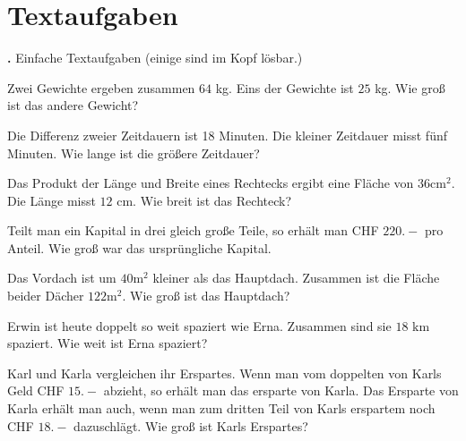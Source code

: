 \platzFuerBerechnungenBisEndeSeite{}
\newpage

\section{Textaufgaben}

\textbf{\bbwAufgabenNummer{}.}
Einfache Textaufgaben (einige sind im Kopf lösbar.)

\begin{bbwAufgabenBlock}
\item Zwei Gewichte ergeben zusammen $64$ kg. Eins der Gewichte ist
$25$ kg. Wie groß ist das andere Gewicht?


\item Die Differenz zweier Zeitdauern ist 18 Minuten. Die kleiner
Zeitdauer misst fünf Minuten. Wie lange ist die größere Zeitdauer?


\item Das Produkt der Länge und Breite eines Rechtecks ergibt eine
Fläche von $36 \text{cm}^2$. Die Länge misst $12$ cm. Wie breit ist
das Rechteck?



\item Teilt man ein Kapital in drei gleich große Teile, so erhält man
CHF $220.-$ pro Anteil. Wie groß war das ursprüngliche Kapital.


\item Das Vordach ist um $40 \text{m}^2$ kleiner als das
Hauptdach. Zusammen ist die Fläche beider Dächer $122 \text{m}^2$. Wie
groß ist das Hauptdach?

\noTRAINER{\newpage}

\item Erwin ist heute doppelt so weit spaziert wie Erna. Zusammen sind
sie $18 \text{ km}$ spaziert. Wie weit ist Erna spaziert?


\item Karl und Karla vergleichen ihr Erspartes. Wenn man vom doppelten
von Karls Geld CHF $15.-$ abzieht, so erhält man das ersparte von
Karla. Das Ersparte von Karla erhält man auch, wenn man zum dritten
Teil von Karls erspartem noch CHF $18.-$ dazuschlägt. Wie groß ist
Karls Erspartes?


\end{bbwAufgabenBlock}
